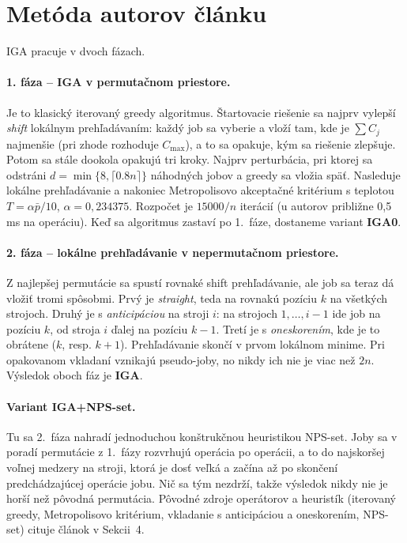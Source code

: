 \documentclass[11pt,a4paper]{article}
\newcommand{\Csum}{\sum C_j}
\begin{document}
\section{Metóda autorov článku}

IGA \cite{RittRossit2024} pracuje v dvoch fázach.

\paragraph{1. fáza -- IGA v permutačnom priestore.} Je to klasický iterovaný greedy algoritmus.
Štartovacie riešenie sa najprv vylepší \emph{shift} lokálnym prehľadávaním: každý job sa
vyberie a vloží tam, kde je $\Csum$ najmenšie (pri zhode rozhoduje $C_{\max}$), a to sa
opakuje, kým sa riešenie zlepšuje. Potom sa stále dookola opakujú tri kroky. Najprv
perturbácia, pri ktorej sa odstráni $d=\min\{8,\lceil 0.8n\rceil\}$ náhodných jobov a greedy
sa vložia späť. Nasleduje lokálne prehľadávanie a nakoniec Metropolisovo akceptačné kritérium
s teplotou $T=\alpha\bar p/10$, $\alpha=0{,}234375$. Rozpočet je $15000/n$ iterácií (u autorov
približne 0,5\,ms na operáciu). Keď sa algoritmus zastaví po 1.~fáze, dostaneme variant \textbf{IGA0}.

\paragraph{2. fáza -- lokálne prehľadávanie v nepermutačnom priestore.} Z najlepšej permutácie
sa spustí rovnaké shift prehľadávanie, ale job sa teraz dá vložiť tromi spôsobmi. Prvý je
\emph{straight}, teda na rovnakú pozíciu $k$ na všetkých strojoch. Druhý je s \emph{anticipáciou}
na stroji $i$: na strojoch $1,\dots,i-1$ ide job na pozíciu $k$, od stroja $i$ ďalej na pozíciu
$k-1$. Tretí je s \emph{oneskorením}, kde je to obrátene ($k$, resp. $k+1$). Prehľadávanie
skončí v prvom lokálnom minime. Pri opakovanom vkladaní vznikajú pseudo-joby, no nikdy ich nie
je viac než $2n$. Výsledok oboch fáz je \textbf{IGA}.

\paragraph{Variant IGA+NPS-set.} Tu sa 2.~fáza nahradí jednoduchou konštrukčnou heuristikou
NPS-set. Joby sa v poradí permutácie z 1.~fázy rozvrhujú operácia po operácii, a to do
najskoršej voľnej medzery na stroji, ktorá je dosť veľká a začína až po skončení predchádzajúcej
operácie jobu. Nič sa tým nezdrží, takže výsledok nikdy nie je horší než pôvodná permutácia.
Pôvodné zdroje operátorov a heuristík (iterovaný greedy, Metropolisovo kritérium, vkladanie
s anticipáciou a oneskorením, NPS-set) cituje článok \cite{RittRossit2024} v Sekcii~4.
\end{document}
